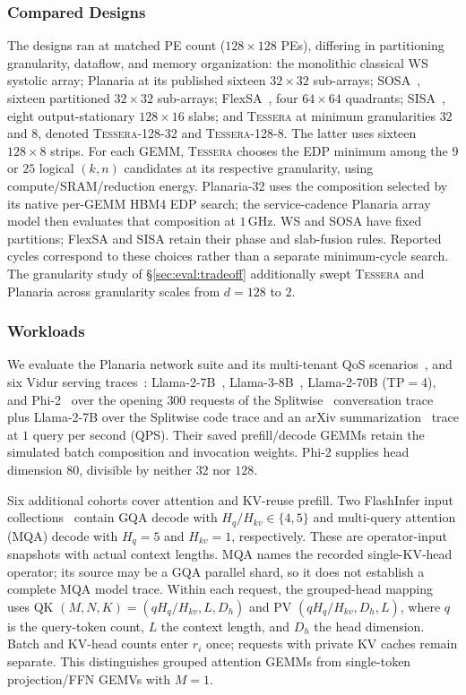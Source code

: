 \subsubsection{Compared Designs}
The designs ran at matched PE count ($128{\times}128$ PEs),
differing in partitioning granularity, dataflow,
and memory organization:
the monolithic classical WS systolic array; Planaria at its published
sixteen $32{\times}32$ sub-arrays;
SOSA~\cite{yuzuguler2022scale}, sixteen partitioned
$32{\times}32$ sub-arrays; FlexSA~\cite{lym2020flexsa}, four $64{\times}64$
quadrants; SISA~\cite{altamura2026sisa}, eight output-stationary
$128{\times}16$ slabs; and \textsc{Tessera} at minimum granularities
$32$ and $8$, denoted \textsc{Tessera}-128-32 and
\textsc{Tessera}-128-8. The latter uses sixteen $128{\times}8$ strips.
For each GEMM, \textsc{Tessera} chooses the EDP minimum among the
$9$ or $25$ logical $(k,n)$ candidates at its respective granularity,
using compute/SRAM/reduction energy.
Planaria-32 uses the composition selected by its native per-GEMM
HBM4 EDP search; the service-cadence Planaria array model then evaluates
that composition at $1$\,GHz.
WS and SOSA have fixed partitions; FlexSA and SISA retain their
phase and slab-fusion rules. Reported cycles correspond to
these choices rather than a separate minimum-cycle search.
The granularity study of
\S\ref{sec:eval:tradeoff} additionally swept \textsc{Tessera} and Planaria
across granularity scales from $d{=}128$ to $2$.

\subsubsection{Workloads}
We evaluate the Planaria network suite and its multi-tenant QoS
scenarios~\cite{ghodrati2020planaria}, and six
Vidur serving traces~\cite{agrawal2024vidur}:
Llama-2-7B~\cite{touvron2023llama2openfoundation},
Llama-3-8B~\cite{grattafiori2024llama3herdmodels},
Llama-2-70B (TP$=$4), and Phi-2~\cite{javaheripi2023phi2} over
the opening $300$ requests of
the Splitwise~\cite{patel2024splitwise} conversation trace plus Llama-2-7B
over the Splitwise code trace and an arXiv
summarization~\cite{cohan2018discourseawareattentionmodelabstractive}
trace at $1$ query per second (QPS). Their saved prefill/decode GEMMs
retain the simulated batch composition and invocation weights.
Phi-2 supplies head dimension $80$, divisible by neither $32$ nor $128$.

Six additional cohorts cover attention and KV-reuse prefill.
Two FlashInfer input collections~\cite{flashinfertrace} contain GQA
decode with $H_q/H_{kv}\in\{4,5\}$ and multi-query attention (MQA)
decode with $H_q=5$ and $H_{kv}=1$, respectively. These are operator-input
snapshots with actual context lengths. MQA names the recorded
single-KV-head operator; its source may be a GQA parallel shard,
so it does not establish a complete MQA model trace. Within each request, the
grouped-head mapping uses QK $(M,N,K)=(qH_q/H_{kv},L,D_h)$ and PV
$(qH_q/H_{kv},D_h,L)$, where $q$ is the query-token count, $L$ the
context length, and $D_h$ the head dimension. Batch and KV-head counts
enter $r_i$ once; requests with private KV caches remain separate. This
distinguishes grouped attention GEMMs from single-token projection/FFN
GEMVs with $M=1$.

